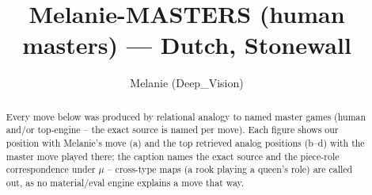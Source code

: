 \documentclass[11pt]{article}
\title{Melanie-MASTERS (human masters) — Dutch, Stonewall}
\author{Melanie (Deep\_Vision)}
\date{}
\begin{document}
\maketitle

\begin{abstract}Every move below was produced by relational analogy to named master games (human and/or top-engine -- the exact source is named per move). Each figure shows our position with Melanie's move (a) and the top retrieved analog positions (b--d) with the master move played there; the caption names the exact source and the piece-role correspondence under $\mu$ -- cross-type maps (a rook playing a queen's role) are called out, as no material/eval engine explains a move that way.\end{abstract}

\begin{figure}[p]\centering
\begin{subfigure}{0.46\textwidth}\centering
\resizebox{\linewidth}{!}{%
\newchessgame
\chessboard[
  setfen={rnbqk2r/pp4pp/2pbpn2/3p1p2/2PP4/1P3NP1/P3PPBP/RNBQ1RK1 b kq - 0 7},
  showmover=false,
  pgfstyle=straightmove, color=movearrow, markmove={d5-c4}
]}
\caption{}
\end{subfigure}\hfill
\begin{subfigure}{0.46\textwidth}\centering
\resizebox{\linewidth}{!}{%
\newchessgame
\chessboard[
  setfen={r1bq1rk1/3nbppp/p2p4/npp1p3/3PP3/2P2N1P/PPB2PP1/RNBQR1K1 w - - 1 12},
  showmover=false,
  pgfstyle=straightmove, color=movearrow, markmove={d4-d5}
]}
\caption{}
\end{subfigure}
\\[4pt]
\begin{subfigure}{0.46\textwidth}\centering
\resizebox{\linewidth}{!}{%
\newchessgame
\chessboard[
  setfen={r1bq1rk1/3nbppp/p2p4/npp1p3/3PP3/2P2N1P/PPB2PP1/RNBQR1K1 w - - 1 12},
  showmover=false,
  pgfstyle=straightmove, color=movearrow, markmove={d4-d5}
]}
\caption{}
\end{subfigure}\hfill
\begin{subfigure}{0.46\textwidth}\centering
\resizebox{\linewidth}{!}{%
\newchessgame
\chessboard[
  setfen={rnbq1rk1/5pbp/p2p1np1/1ppP4/2P5/2NB1N1P/PP3PP1/R1BQ1RK1 w - - 0 11},
  showmover=false,
  pgfstyle=straightmove, color=movearrow, markmove={c4-b5}
]}
\caption{}
\end{subfigure}

\end{figure}
\end{document}
